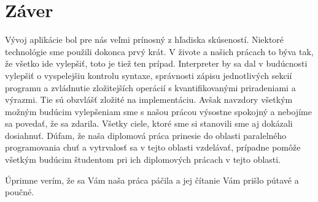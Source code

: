 \chapter{Záver}\label{chap:end}
Vývoj aplikácie bol pre nás veľmi prínosný z hľadiska skúseností. Niektoré technológie sme 
použili dokonca prvý krát. V živote a našich prácach to býva tak, že všetko ide vylepšiť, 
toto je tiež ten prípad. Interpreter by sa dal v budúcnosti vylepšiť o vyspelejšiu kontrolu 
syntaxe, správnosti zápisu jednotlivých sekcií programu a zvládnutie zložitejších operácií s 
kvantifikovanými priradeniami a výrazmi. Tie sú obzvlášť zložité na implementáciu. Avšak 
navzdory všetkým možným budúcim vylepšeniam sme s našou prácou výsostne spokojný a 
nebojíme sa povedať, že sa zdarila. Všetky ciele, ktoré sme si stanovili sme aj dokázali
dosiahnuť. Dúfam, že naša diplomová práca prinesie do oblasti
paralelného programovania chuť a vytrvalosť sa v tejto oblasti vzdelávať, prípadne pomôže 
všetkým budúcim študentom pri ich diplomových prácach v tejto oblasti.

Úprimne verím, že sa Vám naša práca páčila a jej čítanie Vám prišlo pútavé a poučné.